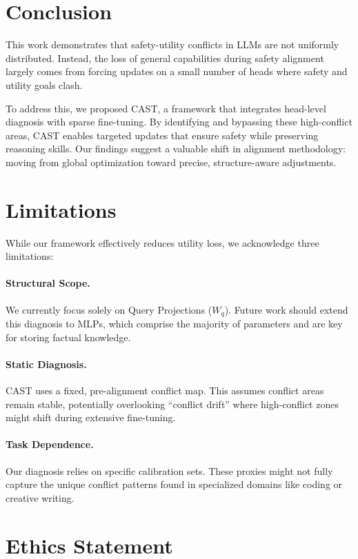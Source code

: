 \documentclass[11pt]{article}
\begin{document}
\section{Conclusion}

This work demonstrates that safety-utility conflicts in LLMs are not uniformly distributed. Instead, the loss of general capabilities during safety alignment largely comes from forcing updates on a small number of heads where safety and utility goals clash.

To address this, we proposed CAST, a framework that integrates head-level diagnosis with sparse fine-tuning. By identifying and bypassing these high-conflict areas, CAST enables targeted updates that ensure safety while preserving reasoning skills. Our findings suggest a valuable shift in alignment methodology: moving from global optimization toward precise, structure-aware adjustments.

\section{Limitations}

While our framework effectively reduces utility loss, we acknowledge three limitations:

\paragraph{Structural Scope.}
We currently focus solely on Query Projections ($W_q$). Future work should extend this diagnosis to MLPs, which comprise the majority of parameters and are key for storing factual knowledge.

\paragraph{Static Diagnosis.}
CAST uses a fixed, pre-alignment conflict map. This assumes conflict areas remain stable, potentially overlooking ``conflict drift'' where high-conflict zones might shift during extensive fine-tuning.

\paragraph{Task Dependence.}
Our diagnosis relies on specific calibration sets. These proxies might not fully capture the unique conflict patterns found in specialized domains like coding or creative writing.


\section*{Ethics Statement}
\end{document}
